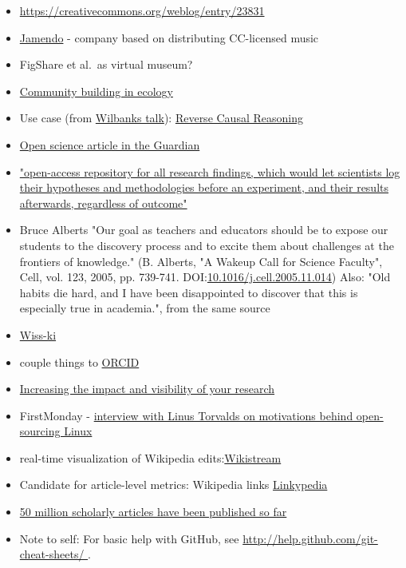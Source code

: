 \documentclass[final,authoryear,3p]{elsarticle-open-drafting}
\begin{document}
\begin{itemize}
	\item \href{https://creativecommons.org/weblog/entry/23831}{https://creativecommons.org/weblog/entry/23831}
	\item \href{http://www.jamendo.com/en/creativecommons}{Jamendo} - company based on distributing CC-licensed music
	\item FigShare et al.\ as virtual museum?
	\item \href{http://dx.doi.org/10.1038/npre.2010.4603.1}{Community building in ecology}
	\item Use case (from \href{}{Wilbanks talk}): \href{http://selventa.com/technology/white-papers}{Reverse Causal Reasoning}
	\item \href{http://www.guardian.co.uk/education/2011/may/22/open-science-shared-research-internet}{Open science article in the Guardian}
	\item \href{http://www.nature.com/news/2011/110223/full/470437a.html}{"open-access repository for all research findings, which would let scientists log their hypotheses and methodologies before an experiment, and their results afterwards, regardless of outcome"}
	\item Bruce Alberts "Our goal as teachers and educators should be to expose our students to the discovery process and to excite them about challenges at the frontiers of knowledge." (B. Alberts, "A Wakeup Call for Science Faculty", Cell, vol. 123, 2005, pp. 739-741. DOI:\href{http://dx.doi.org/10.1016/j.cell.2005.11.014}{10.1016/j.cell.2005.11.014})
	Also: "Old habits die hard, and I have been disappointed to discover that this is especially true in academia.", from the same source
	\item \href{http://wiss-ki.eu/}{Wiss-ki}
	\item couple things to \href{http://orcid.org/}{ORCID}
	\item \href{http://www.jisc.ac.uk/supportingyourinstitution/researchexcellence/researchvisibility.aspx}{Increasing the impact and visibility of your research}
	\item FirstMonday - \href{http://firstmonday.org/htbin/cgiwrap/bin/ojs/index.php/fm/article/view/583/504}{interview with Linus Torvalds on motivations behind open-sourcing Linux}
	\item real-time visualization of Wikipedia edits:\href{https://github.com/edsu/wikistream}{Wikistream} 
	\item Candidate for article-level metrics: Wikipedia links \href{https://github.com/Daniel-Mietchen/linkypedia}{Linkypedia} 
	\item \href{http://dx.doi.org/10.1087/20100308}{50 million scholarly articles have been published so far}
	\item Note to self: For basic help with GitHub, see \href{http://help.github.com/git-cheat-sheets/}{http://help.github.com/git-cheat-sheets/ } .
\end{itemize}
\end{document}
